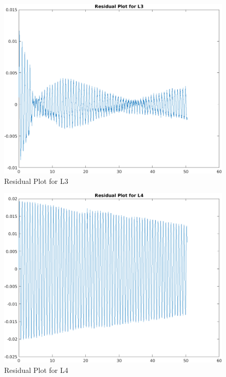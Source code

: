 \begin{figure}[h!]
    \centering
    \includegraphics[width=\textwidth]{figures/L3_R.png}
    \caption{Residual Plot for L3}
    \label{fig:yx}
\end{figure}
\newpage
\begin{figure}[h!]
    \centering
    \includegraphics[width=\textwidth]{figures/L4_R.png}
    \caption{Residual Plot for L4}
    \label{fig:yx}
\end{figure}
\newpage
